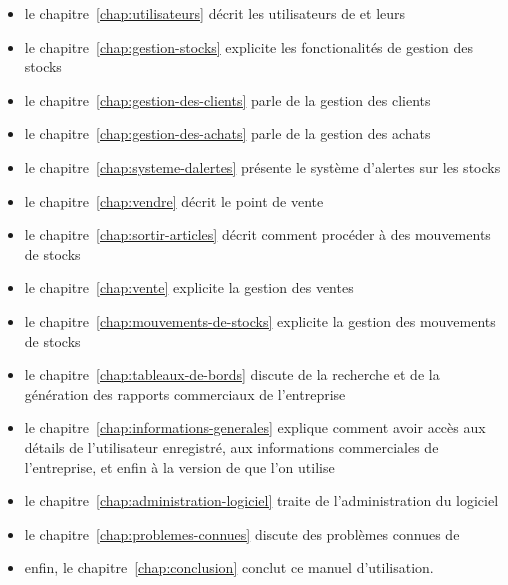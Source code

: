\begin{itemize}[]
	\item le chapitre~\ref{chap:utilisateurs} d\'ecrit
	les utilisateurs de \yeroth et leurs \roles
	     
	\item le chapitre~\ref{chap:gestion-stocks} explicite
	les fonctionalit\'es de gestion des stocks

	\item le chapitre~\ref{chap:gestion-des-clients} parle
	de la gestion des clients

	\item le chapitre~\ref{chap:gestion-des-achats} parle
	de la gestion des achats
	
	\item le chapitre~\ref{chap:systeme-dalertes}
	pr\'esente le syst\`eme d'alertes sur les stocks
	
	\item le chapitre~\ref{chap:vendre} d\'ecrit le
	point de vente
	
	\item le chapitre~\ref{chap:sortir-articles} d\'ecrit
	comment proc\'eder \`a des mouvements de stocks
	
	\item le chapitre~\ref{chap:vente} explicite la gestion
	des ventes
	
	\item le chapitre~\ref{chap:mouvements-de-stocks} explicite
	la gestion des mouvements de stocks
	
	\item le chapitre~\ref{chap:tableaux-de-bords} discute
	de la recherche et de la g\'en\'eration des rapports
	commerciaux de l'entreprise
	
	\item le chapitre~\ref{chap:informations-generales}
	explique comment avoir acc\`es aux d\'etails de
	l'utilisateur enregistr\'e, aux informations commerciales
	de l'entreprise, et enfin \`a la version de \yeroth que
	l'on utilise
	
	\item le chapitre~\ref{chap:administration-logiciel}
	traite de l'administration du logiciel

	\item le chapitre~\ref{chap:problemes-connues}
	discute des probl\`emes connues de \yeroth
	
	\item enfin, le chapitre~\ref{chap:conclusion} conclut
	ce manuel d'utilisation.
\end{itemize}

